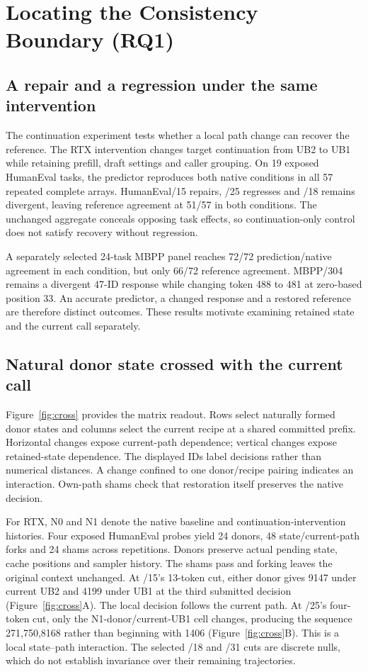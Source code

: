 \section{Locating the Consistency Boundary (RQ1)}
\label{sec:diagnosis}
\subsection{A repair and a regression under the same intervention}
The continuation experiment tests whether a local path change can recover the reference. The RTX intervention changes target continuation from UB2 to UB1 while retaining prefill, draft settings and caller grouping. On 19 exposed HumanEval tasks, the predictor reproduces both native conditions in all 57 repeated complete arrays. HumanEval/15 repairs, /25 regresses and /18 remains divergent, leaving reference agreement at 51/57 in both conditions. The unchanged aggregate conceals opposing task effects, so continuation-only control does not satisfy recovery without regression.

A separately selected 24-task MBPP panel reaches 72/72 prediction/native agreement in each condition, but only 66/72 reference agreement. MBPP/304 remains a divergent 47-ID response while changing token 488 to 481 at zero-based position 33. An accurate predictor, a changed response and a restored reference are therefore distinct outcomes. These results motivate examining retained state and the current call separately.

\subsection{Natural donor state crossed with the current call}
Figure~\ref{fig:cross} provides the matrix readout. Rows select naturally formed donor states and columns select the current recipe at a shared committed prefix. Horizontal changes expose current-path dependence; vertical changes expose retained-state dependence. The displayed IDs label decisions rather than numerical distances. A change confined to one donor/recipe pairing indicates an interaction. Own-path shams check that restoration itself preserves the native decision.

For RTX, N0 and N1 denote the native baseline and continuation-intervention histories. Four exposed HumanEval probes yield 24 donors, 48 state/current-path forks and 24 shams across repetitions. Donors preserve actual pending state, cache positions and sampler history. The shams pass and forking leaves the original context unchanged. At /15's 13-token cut, either donor gives 9147 under current UB2 and 4199 under UB1 at the third submitted decision (Figure~\ref{fig:cross}A). The local decision follows the current path. At /25's four-token cut, only the N1-donor/current-UB1 cell changes, producing the sequence 271,750,8168 rather than beginning with 1406 (Figure~\ref{fig:cross}B). This is a local state--path interaction. The selected /18 and /31 cuts are discrete nulls, which do not establish invariance over their remaining trajectories.

